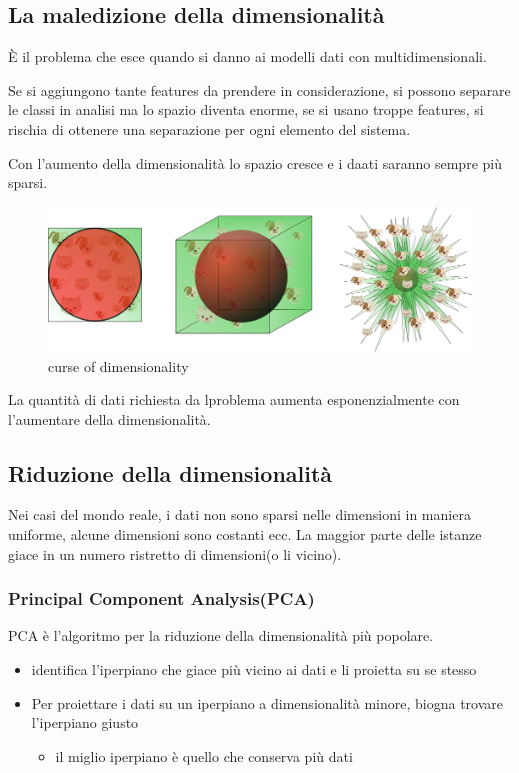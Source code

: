 \subsection{La maledizione della dimensionalità}
È il problema che esce quando si danno ai modelli dati con multidimensionali.

Se si aggiungono tante features da prendere in considerazione, si possono separare
le classi in analisi ma lo spazio diventa enorme, se si usano troppe features,
si rischia di ottenere una separazione per ogni elemento del sistema.

Con l'aumento della dimensionalità lo spazio cresce e i daati saranno sempre più
sparsi.

\begin{figure}[H]
    \centering
    \includegraphics[width=0.6\linewidth]{imgs/curse-of-dimensionality}
    \caption{curse of dimensionality}
    \label{fig:curse_of_dimensionality}
\end{figure}
La quantità di dati richiesta da lproblema aumenta esponenzialmente con l'aumentare
della dimensionalità.

\subsection{Riduzione della dimensionalità}
Nei casi del mondo reale, i dati non sono sparsi nelle dimensioni in maniera uniforme,
alcune dimensioni sono costanti ecc.
La maggior parte delle istanze giace in un numero ristretto di dimensioni(o li vicino).


\subsubsection{Principal Component Analysis(PCA)}

PCA è l'algoritmo per la riduzione della dimensionalità più popolare.

\begin{itemize}
    \item identifica l'iperpiano che giace più vicino ai dati e li proietta su se stesso
    \item Per proiettare i dati su un iperpiano a dimensionalità minore, biogna trovare l'iperpiano giusto
    \begin{itemize}
        \item il miglio iperpiano è quello che conserva più dati
    \end{itemize}
\end{itemize}

